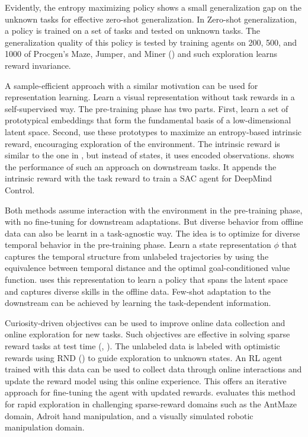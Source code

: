 \documentclass{article}
\begin{document}
Evidently, the entropy maximizing policy shows a small generalization gap on the unknown tasks for effective zero-shot generalization. In Zero-shot generalization, a policy is trained on a set of tasks and tested on unknown tasks. The generalization quality of this policy is tested by training agents on 200, 500, and 1000 of Procgen's Maze, Jumper, and Miner (\cite{zisselman2023explore}) and such exploration learns reward invariance. 

A sample-efficient approach with a similar motivation can be used for representation learning. Learn a visual representation without task rewards in a self-supervised way. The pre-training phase has two parts. First, learn a set of prototypical embeddings that form the fundamental basis of a low-dimensional latent space. Second, use these prototypes to maximize an entropy-based intrinsic reward, encouraging exploration of the environment. The intrinsic reward is similar to the one in \cite{zisselman2023explore}, but instead of states, it uses encoded observations. \cite{yarats2021reinforcement} shows the performance of such an approach on downstream tasks. It appends the intrinsic reward with the task reward to train a SAC agent for DeepMind Control. 

Both methods assume interaction with the environment in the pre-training phase, with no fine-tuning for downstream adaptations. But diverse behavior from offline data can also be learnt in a task-agnostic way. The idea is to optimize for diverse temporal behavior in the pre-training phase. Learn a state representation $\phi$ that captures the temporal structure from unlabeled trajectories by using the equivalence between temporal distance and the optimal goal-conditioned value function. \cite{park2024foundation} uses this representation to learn a policy that spans the latent space and captures diverse skills in the offline data. Few-shot adaptation to the downstream can be achieved by learning the task-dependent information.

Curiosity-driven objectives can be used to improve online data collection and online exploration for new tasks. Such objectives are effective in solving sparse reward tasks at test time (\cite{burda2018exploration}, \cite{li2023accelerating}). The unlabeled data is labeled with optimistic rewards using RND (\cite{burda2018exploration}) to guide exploration to unknown states. An RL agent trained with this data can be used to collect data through online interactions and update the reward model using this online experience. This offers an iterative approach for fine-tuning the agent with updated rewards. \cite{li2023accelerating} evaluates this method for rapid exploration in challenging sparse-reward domains such as the AntMaze domain, Adroit hand manipulation, and a visually simulated robotic manipulation domain. 
\end{document}
